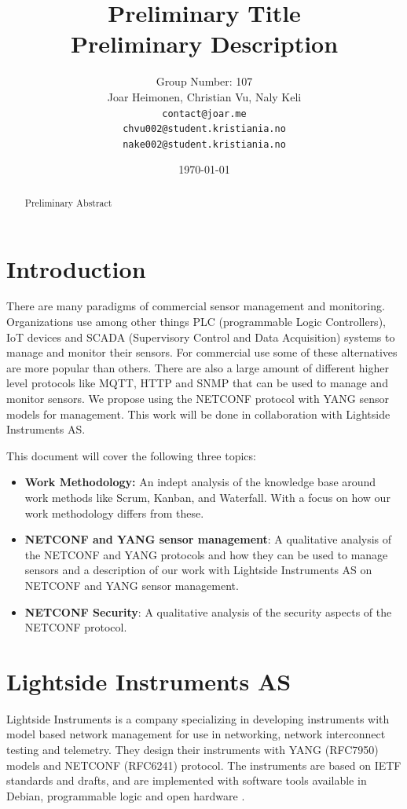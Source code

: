 \documentclass[12pt]{article}
\author{
    Group Number: 107\\
    Joar Heimonen, Christian Vu, Naly Keli \\
    \texttt{contact@joar.me}\\ 
    \texttt{chvu002@student.kristiania.no}\\
    \texttt{nake002@student.kristiania.no}
}
\title{
  \textbf{Preliminary Title}\\
  \large{Preliminary Description}
}
\date{\today}
\begin{document}
\maketitle

\begin{abstract}
  Preliminary Abstract
\end{abstract}

\pagebreak

\tableofcontents

\pagebreak


\section{Introduction}
There are many paradigms of commercial sensor management and monitoring. Organizations use among other things
PLC (programmable Logic Controllers), IoT devices and SCADA (Supervisory Control and Data Acquisition) systems to 
manage and monitor their sensors. For commercial use 
some of these alternatives are more popular than others. There are also a large amount of different higher level protocols
like MQTT, HTTP and SNMP that can be used to manage and monitor sensors. We propose using the NETCONF protocol 
with YANG sensor models for management. This work will be done in collaboration with Lightside Instruments AS.


This document will cover the following three topics:
\begin{itemize}
  \item \textbf{Work Methodology:} An indept analysis of the knowledge base around work methods like Scrum, Kanban, and Waterfall. 
  With a focus on how our work methodology differs from these.
  \item \textbf{NETCONF and YANG sensor management}: A qualitative analysis of the NETCONF and YANG protocols and how they can be used to manage sensors and 
  a description of our work with Lightside Instruments AS on NETCONF and YANG sensor management.
  \item \textbf{NETCONF Security}: A qualitative analysis of the security aspects of the NETCONF protocol.
\end{itemize}

\section{Lightside Instruments AS}
Lightside Instruments is a company specializing in developing instruments with model based network management 
for use in networking, network interconnect testing and telemetry. 
They design their instruments with YANG (RFC7950) \cite{bjorklundYANG11Data2016} models and NETCONF (RFC6241) \cite{ennsNetworkConfigurationProtocol2011} protocol. 
The instruments are based on IETF standards and drafts, 
and are implemented with software tools available in Debian, programmable 
logic and open hardware \cite{LightsideInstrumentsYANG}.
\end{document}
